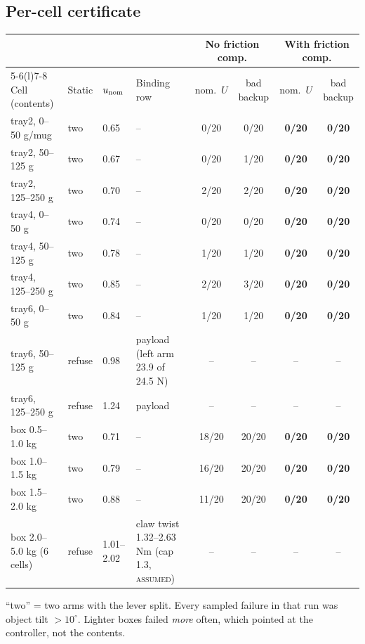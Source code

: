 \documentclass[11pt,a4paper]{article}
\newcommand{\lab}[1]{\textsc{#1}}
\begin{document}
\subsection{Per-cell certificate}
\begin{center}\small
\footnotesize\begin{tabular}{@{}lllp{3.0cm}cccc@{}}
\toprule
 & & & & \multicolumn{2}{c}{No friction comp.} & \multicolumn{2}{c}{With friction comp.}\\ \cmidrule(l){5-6}\cmidrule(l){7-8}
Cell (contents) & Static & $u_{\rm nom}$ & Binding row & nom.\ $U$ & bad backup & nom.\ $U$ & bad backup\\
\midrule
tray2, 0--50 g/mug & two & 0.65 & -- & 0/20 & 0/20 & \textbf{0/20} & \textbf{0/20}\\
tray2, 50--125 g & two & 0.67 & -- & 0/20 & 1/20 & \textbf{0/20} & \textbf{0/20}\\
tray2, 125--250 g & two & 0.70 & -- & 2/20 & 2/20 & \textbf{0/20} & \textbf{0/20}\\
tray4, 0--50 g & two & 0.74 & -- & 0/20 & 0/20 & \textbf{0/20} & \textbf{0/20}\\
tray4, 50--125 g & two & 0.78 & -- & 1/20 & 1/20 & \textbf{0/20} & \textbf{0/20}\\
tray4, 125--250 g & two & 0.85 & -- & 2/20 & 3/20 & \textbf{0/20} & \textbf{0/20}\\
tray6, 0--50 g & two & 0.84 & -- & 1/20 & 1/20 & \textbf{0/20} & \textbf{0/20}\\
\rowcolor{bad} tray6, 50--125 g & refuse & 0.98 & payload (left arm 23.9 of 24.5 N) & -- & -- & -- & --\\
\rowcolor{bad} tray6, 125--250 g & refuse & 1.24 & payload & -- & -- & -- & --\\
box 0.5--1.0 kg & two & 0.71 & -- & 18/20 & 20/20 & \textbf{0/20} & \textbf{0/20}\\
box 1.0--1.5 kg & two & 0.79 & -- & 16/20 & 20/20 & \textbf{0/20} & \textbf{0/20}\\
box 1.5--2.0 kg & two & 0.88 & -- & 11/20 & 20/20 & \textbf{0/20} & \textbf{0/20}\\
\rowcolor{bad} box 2.0--5.0 kg (6 cells) & refuse & 1.01--2.02 & claw twist 1.32--2.63 Nm (cap 1.3, \lab{assumed}) & -- & -- & -- & --\\
\bottomrule
\end{tabular}
\end{center}
``two'' = two arms with the lever split. Every sampled failure in that run was object tilt $>10^\circ$. Lighter boxes failed \emph{more} often, which pointed at the
controller, not the contents.
\end{document}
